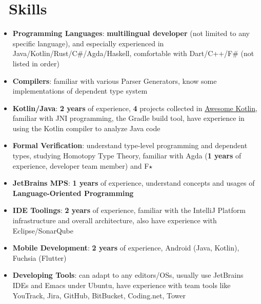 \documentclass{resume}
\begin{document}
\section{\faCogs\ Skills}
\begin{itemize}[parsep=0.25ex]
  \item \textbf{Programming Languages}:
    \textbf{multilingual developer} (not limited to any specific language),
    and especially experienced in Java/Kotlin/Rust/C\#/Agda/Haskell,
    comfortable with Dart/C++/F\# (not listed in order)

  \item \textbf{Compilers}:
    familiar with various Parser Generators, know some implementations of dependent type system

  \item \textbf{Kotlin/Java}:
    \textbf{2 years} of experience,
    \textbf{4} projects collected in
    \href{https://kotlin.link/?q=ice} {Awesome Kotlin},
    familiar with JNI programming, the Gradle build tool, have experience in using the Kotlin compiler to analyze Java code

  \item \textbf{Formal Verification}:
    understand type-level programming and dependent types, studying Homotopy Type Theory,
    familiar with Agda (\textbf{1 years} of experience, developer team member) and F$\star$

  \item \textbf{JetBrains MPS}:
    \textbf{1 years} of experience,
    understand concepts and usages of \textbf{Language-Oriented Programming}

  \item \textbf{IDE Toolings}:
    \textbf{2 years} of experience,
    familiar with the IntelliJ Platform infrastructure and overall architecture,
    also have experience with Eclipse/SonarQube

  \item \textbf{Mobile Development}:
    \textbf{2 years} of experience,
    Android (Java, Kotlin), Fuchsia (Flutter)

  \item \textbf{Developing Tools}:
    can adapt to any editors/OSs, usually use JetBrains IDEs and Emacs under Ubuntu, have experience with team tools like YouTrack, Jira, GitHub, BitBucket, Coding.net, Tower
\end{itemize}

\end{document}

